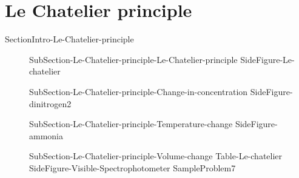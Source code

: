 \documentclass[main.tex]{subfiles}
\begin{document}
\section{Le Chatelier principle}{SectionIntro-Le-Chatelier-principle}
\sloppy\begin{description}
\item[] {SubSection-Le-Chatelier-principle-Le-Chatelier-principle}
{SideFigure-Le-chatelier}
\item[] {SubSection-Le-Chatelier-principle-Change-in-concentration}
{SideFigure-dinitrogen2}
\item[] {SubSection-Le-Chatelier-principle-Temperature-change}
{SideFigure-ammonia}
\item[] {SubSection-Le-Chatelier-principle-Volume-change}
{Table-Le-chatelier} 
{SideFigure-Visible-Spectrophotometer}
{SampleProblem7}
\end{description}
\end{document}
